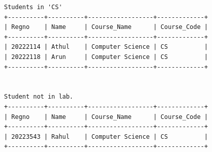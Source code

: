 \documentclass{article}
\begin{document}
\newpage
{}
\begin{verbatim}
Students in 'CS'
+----------+----------+------------------+-------------+
| Regno    | Name     | Course_Name      | Course_Code |
+----------+----------+------------------+-------------+
| 20222114 | Athul    | Computer Science | CS          |
| 20222118 | Arun     | Computer Science | CS          |
+----------+----------+------------------+-------------+


Student not in lab.
+----------+----------+------------------+-------------+
| Regno    | Name     | Course_Name      | Course_Code |
+----------+----------+------------------+-------------+
| 20223543 | Rahul    | Computer Science | CS          |
+----------+----------+------------------+-------------+

\end{verbatim}
\newpage
\end{document}
